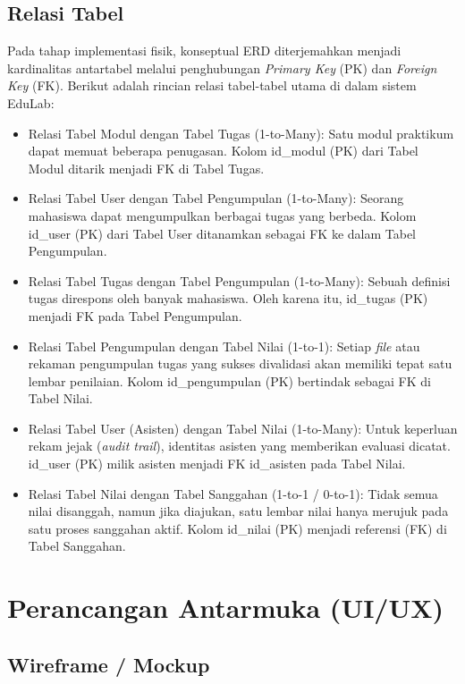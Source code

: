 \documentclass[12pt,a4paper,twoside]{report}
\begin{document}
\subsection{Relasi Tabel}

Pada tahap implementasi fisik, konseptual ERD diterjemahkan menjadi kardinalitas antartabel melalui penghubungan \textit{Primary Key} (PK) dan \textit{Foreign Key} (FK). Berikut adalah rincian relasi tabel-tabel utama di dalam sistem EduLab:

\begin{itemize}
    \item Relasi Tabel Modul dengan Tabel Tugas (1-to-Many): Satu modul praktikum dapat memuat beberapa penugasan. Kolom id\_modul (PK) dari Tabel Modul ditarik menjadi FK di Tabel Tugas.
    \item Relasi Tabel User dengan Tabel Pengumpulan (1-to-Many): Seorang mahasiswa dapat mengumpulkan berbagai tugas yang berbeda. Kolom id\_user (PK) dari Tabel User ditanamkan sebagai FK ke dalam Tabel Pengumpulan.
    \item Relasi Tabel Tugas dengan Tabel Pengumpulan (1-to-Many): Sebuah definisi tugas direspons oleh banyak mahasiswa. Oleh karena itu, id\_tugas (PK) menjadi FK pada Tabel Pengumpulan.
    \item Relasi Tabel Pengumpulan dengan Tabel Nilai (1-to-1): Setiap \textit{file} atau rekaman pengumpulan tugas yang sukses divalidasi akan memiliki tepat satu lembar penilaian. Kolom id\_pengumpulan (PK) bertindak sebagai FK di Tabel Nilai.
    \item Relasi Tabel User (Asisten) dengan Tabel Nilai (1-to-Many): Untuk keperluan rekam jejak (\textit{audit trail}), identitas asisten yang memberikan evaluasi dicatat. id\_user (PK) milik asisten menjadi FK id\_asisten pada Tabel Nilai.
    \item Relasi Tabel Nilai dengan Tabel Sanggahan (1-to-1 / 0-to-1): Tidak semua nilai disanggah, namun jika diajukan, satu lembar nilai hanya merujuk pada satu proses sanggahan aktif. Kolom id\_nilai (PK) menjadi referensi (FK) di Tabel Sanggahan.
\end{itemize}

\section{Perancangan Antarmuka (UI/UX)}

\subsection{Wireframe / Mockup}
\end{document}
